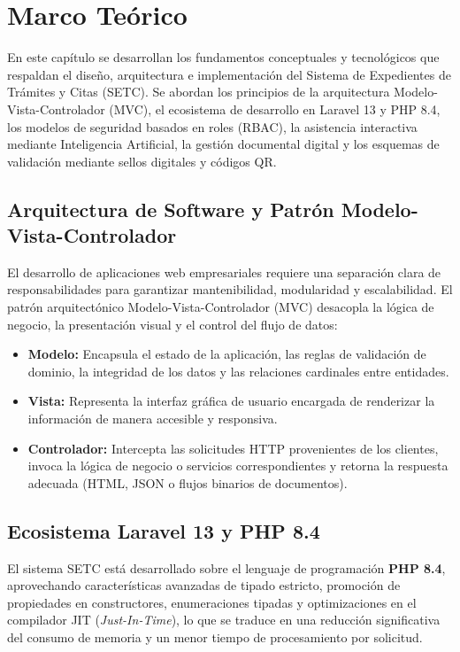 \chapter{Marco Teórico}

En este capítulo se desarrollan los fundamentos conceptuales y tecnológicos que respaldan el diseño, arquitectura e implementación del Sistema de Expedientes de Trámites y Citas (SETC). Se abordan los principios de la arquitectura Modelo-Vista-Controlador (MVC), el ecosistema de desarrollo en Laravel 13 y PHP 8.4, los modelos de seguridad basados en roles (RBAC), la asistencia interactiva mediante Inteligencia Artificial, la gestión documental digital y los esquemas de validación mediante sellos digitales y códigos QR.

\section{Arquitectura de Software y Patrón Modelo-Vista-Controlador}

El desarrollo de aplicaciones web empresariales requiere una separación clara de responsabilidades para garantizar mantenibilidad, modularidad y escalabilidad. El patrón arquitectónico Modelo-Vista-Controlador (MVC) desacopla la lógica de negocio, la presentación visual y el control del flujo de datos:

\begin{itemize}
    \item \textbf{Modelo:} Encapsula el estado de la aplicación, las reglas de validación de dominio, la integridad de los datos y las relaciones cardinales entre entidades.
    \item \textbf{Vista:} Representa la interfaz gráfica de usuario encargada de renderizar la información de manera accesible y responsiva.
    \item \textbf{Controlador:} Intercepta las solicitudes HTTP provenientes de los clientes, invoca la lógica de negocio o servicios correspondientes y retorna la respuesta adecuada (HTML, JSON o flujos binarios de documentos).
\end{itemize}

\section{Ecosistema Laravel 13 y PHP 8.4}

El sistema SETC está desarrollado sobre el lenguaje de programación \textbf{PHP 8.4}, aprovechando características avanzadas de tipado estricto, promoción de propiedades en constructores, enumeraciones tipadas y optimizaciones en el compilador JIT (\textit{Just-In-Time}), lo que se traduce en una reducción significativa del consumo de memoria y un menor tiempo de procesamiento por solicitud.

